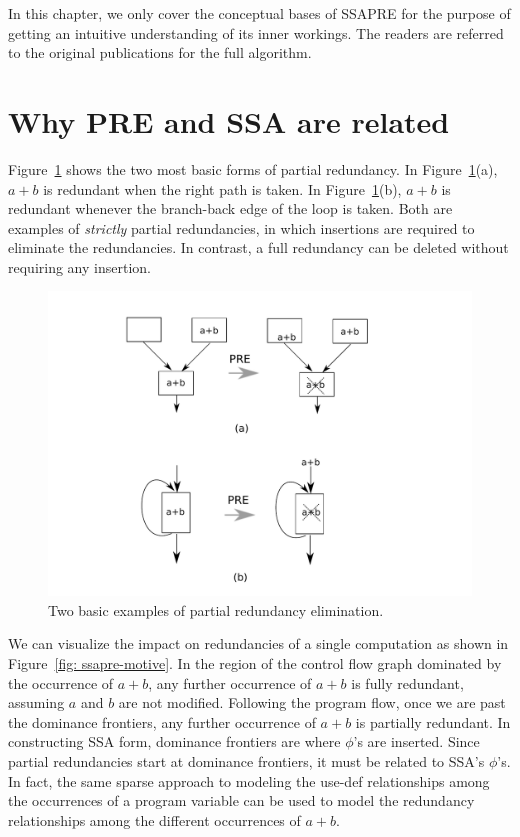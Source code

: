 In this chapter, we only cover the conceptual bases of SSAPRE for the purpose
of getting an intuitive understanding of its inner workings.  The readers are
referred to the original publications for the full 
algorithm\cite{Chow97}\cite{Kennedy99}.

\section{Why PRE and SSA are related}
\label{section:Part3:Pre_not_helped:PRErelatedtoSSA}

Figure~\ref{fig: pre-examples} shows the two most basic forms of partial
redundancy.  In Figure~\ref{fig: pre-examples}(a), $a+b$ is redundant when 
the right path is taken.
In Figure~\ref{fig: pre-examples}(b), $a+b$ is redundant whenever the 
branch-back edge of the loop is taken.  Both are examples of \emph{strictly}
partial redundancies, in which insertions are required to eliminate the
redundancies.  In contrast, a full redundancy can be deleted without requiring 
any insertion.

\begin{figure}
\centering
\includegraphics[scale=0.45]{fig-pre-examples.pdf}
\caption{Two basic examples of partial redundancy elimination.}
\label{fig: pre-examples}
\end{figure}

We can visualize the impact on redundancies of a single computation
as shown in Figure~\ref{fig: ssapre-motive}.  
In the region of the control flow graph dominated by the occurrence of $a+b$, 
any further occurrence of $a+b$ is fully redundant, assuming $a$ and $b$ are
not modified.  Following the program flow,
once we are past the dominance frontiers, any further occurrence of $a+b$ is
partially redundant.  In constructing SSA form, dominance frontiers are where
$\phi$'s are inserted.   Since partial redundancies start at dominance
frontiers, it must be related to SSA's $\phi$'s.  In fact, the same sparse
approach to modeling the use-def relationships among the occurrences of
a program variable can be used to model the redundancy relationships among 
the different occurrences of $a+b$.

